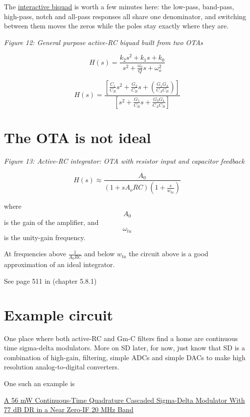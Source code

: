 The
\href{https://wulffern.github.io/aic2026/assets/examples/biquad.html}{interactive
biquad} is worth a few minutes here: the low-pass, band-pass, high-pass,
notch and all-pass responses all share one denominator, and switching
between them moves the zeros while the poles stay exactly where they
are.


{
\centering
{}
}

\emph{Figure 12: General purpose active-RC biquad built from two OTAs}

\[ H(s) = \frac{k_2 s^2 + k_1 s + k_0}{s^2 + \frac{\omega_0}{Q} s +
 \omega_o^2}\]

\[H(s) = \frac{\left[ \frac{C_1}{C_B}s^2 + \frac{G_2}{C_B}s + (\frac{G_1G_3}{C_A C_B})\right]}{\left[ s^2  + \frac{G_5}{C_B}s + \frac{G_3 G_4}{C_A C_B}\right]}\]

\section{The OTA is not ideal}\label{the-ota-is-not-ideal}


{
\centering
{}
}

\emph{Figure 13: Active-RC integrator: OTA with resistor input and
capacitor feedback}

\[ H(s) \approx \frac{A_0}{(1 + s A_o R C)(1 + \frac{s}{w_{ta}})}\]

where \[A_0\] is the gain of the amplifier, and \[\omega_{ta}\] is the
unity-gain frequency.

At frequencies above \(\frac{1}{A_0RC}\) and below \(w_{ta}\) the
circuit above is a good approximation of an ideal integrator.

See page 511 in  (chapter 5.8.1)

\section{Example circuit}\label{example-circuit}

One place where both active-RC and Gm-C filters find a home are
continuous time sigma-delta modulators. More on SD later, for now, just
know that SD is a combination of high-gain, filtering, simple ADCs and
simple DACs to make high resolution analog-to-digital converters.

One such an example is

\href{https://ieeexplore.ieee.org/stamp/stamp.jsp?tp=&arnumber=4381437}{A
56 mW Continuous-Time Quadrature Cascaded Sigma-Delta Modulator With 77
dB DR in a Near Zero-IF 20 MHz Band}

